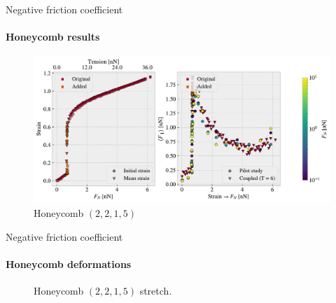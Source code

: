 \documentclass[
	10pt, %
]{beamer}
\begin{document}
\begin{frame}{Negative friction coefficient}
	\framesubtitle{Honeycomb results}
	\begin{figure}[H]
		\centering
		\includegraphics[width=\linewidth]{../thesis/figures/negative_coefficient/manual_coupling_tension_hon2215.pdf}	
	\caption{Honeycomb $(2,2,1,5)$}
	\end{figure}	
\end{frame}
%
%
\begin{frame}{Negative friction coefficient}
	\framesubtitle{Honeycomb deformations}
	\begin{figure}
		\centering    
		\caption{Honeycomb $(2,2,1,5)$ stretch.}
	\end{figure} 
\end{frame}
%
%
\end{document}
